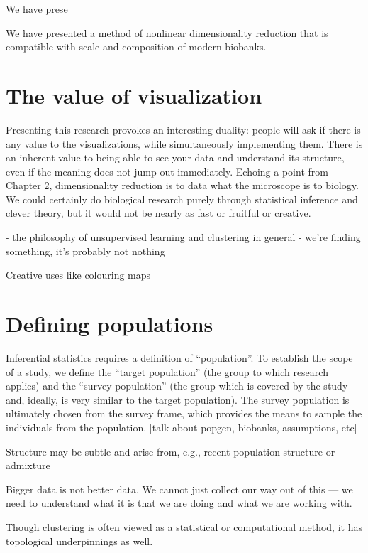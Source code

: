 We have prese

We have presented a method of nonlinear dimensionality reduction that is compatible with scale and composition of modern biobanks. 

\section{The value of visualization}

Presenting this research provokes an interesting duality: people will ask if there is any value to the visualizations, while simultaneously implementing them. There is an inherent value to being able to see your data and understand its structure, even if the meaning does not jump out immediately. Echoing a point from Chapter 2, dimensionality reduction is to data what the microscope is to biology. We could certainly do biological research purely through statistical inference and clever theory, but it would not be nearly as fast or fruitful or creative.

- the philosophy of unsupervised learning and clustering in general
- we're finding something, it's probably not nothing

Creative uses like colouring maps

\section{Defining populations}

Inferential statistics requires a definition of ``population''\citep{statcan2003}. To establish the scope of a study, we define the ``target population'' (the group to which research applies) and the ``survey population'' (the group which is covered by the study and, ideally, is very similar to the target population). The survey population is ultimately chosen from the survey frame, which provides the means to sample the individuals from the population. [talk about popgen, biobanks, assumptions, etc]


Structure may be subtle and arise from, e.g., recent population structure or admixture\citep{gopalan_human_2022}

Bigger data is not better data. We cannot just collect our way out of this --- we need to understand what it is that we are doing and what we are working with.



Though clustering is often viewed as a statistical or computational method, it has topological underpinnings as well.

